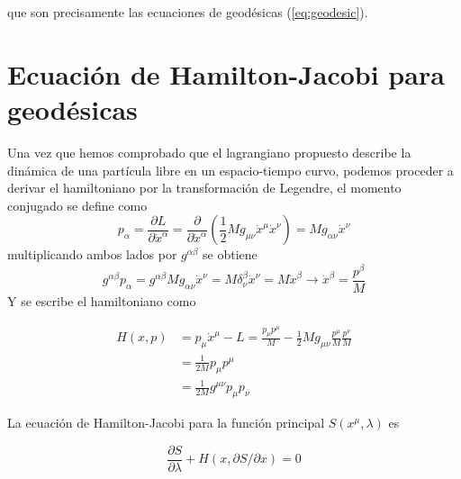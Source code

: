 que son precisamente las ecuaciones de geodésicas (\ref{eq:geodesic}).

\section{Ecuación de Hamilton-Jacobi para geodésicas}
Una vez que hemos comprobado que el lagrangiano propuesto describe la dinámica de una partícula libre en un espacio-tiempo curvo, podemos proceder a derivar el hamiltoniano por la transformación de Legendre, el momento conjugado se define como
\begin{equation}
p_\alpha=\frac{\partial L}{\partial \dot{x}^\alpha}=\frac{\partial }{\partial \dot{x}^\alpha}\left( \frac{1}{2} M g_{\mu \nu} \dot{x}^\mu \dot{x}^\nu\right)= M g_{\alpha \nu} \dot{x}^\nu
\end{equation}
multiplicando ambos lados por $g^{\alpha \beta}$ se obtiene
\begin{equation}
g^{\alpha \beta} p_\alpha = g^{\alpha \beta} M g_{\alpha \nu} \dot{x}^\nu = M \delta^\beta_\nu \dot{x}^\nu = M \dot{x}^\beta \rightarrow  \dot{x}^\beta= \frac{p^{\beta}}{M}
\end{equation}
Y se escribe el hamiltoniano como

\begin{equation}
\begin{aligned}
    H(x, p)&=p_\mu \dot{x}^\mu-L=  \frac{p_\mu p^{\mu}}{M} -\frac{1}{2} M g_{\mu \nu} \frac{p^{\mu}}{M} \frac{p^{\nu}}{M} \\
    &= \frac{1}{2M}  p_\mu p^{\mu}\\
    &= \frac{1}{2M} g^{\mu \nu} p_\mu p_\nu 
\end{aligned}
\end{equation}
 
La ecuación de Hamilton-Jacobi para la función principal $S\left(x^\mu, \lambda\right)$ es

\begin{equation}
\frac{\partial S}{\partial \lambda}+H(x, \partial S / \partial x)=0
\label{eq:HamiltonJacobi}
\end{equation}

